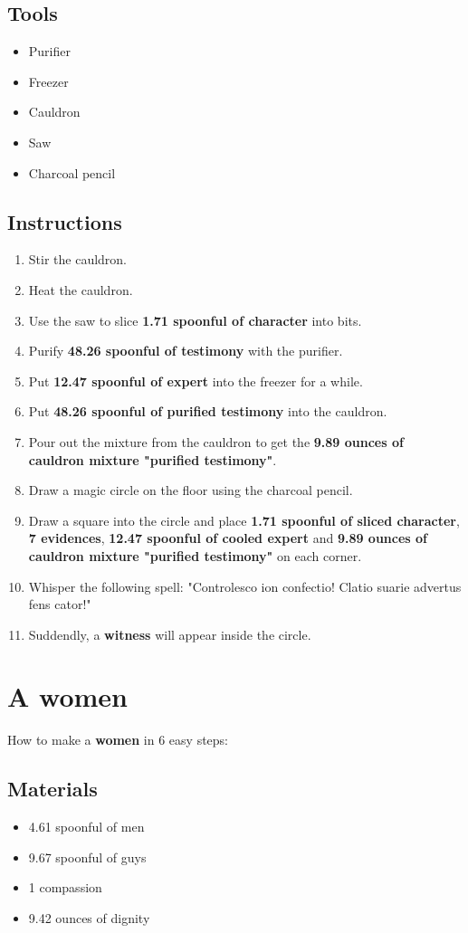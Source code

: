 \documentclass{article}
\begin{document}
\subsection{Tools}\begin{itemize}
\item 
Purifier
\item 
Freezer
\item 
Cauldron
\item 
Saw
\item 
Charcoal pencil
\end{itemize}
\subsection{Instructions}\begin{enumerate}
\item 
Stir the cauldron.
\item 
Heat the cauldron.
\item 
Use the saw to slice \textbf{1.71 spoonful of character} into bits.
\item 
Purify \textbf{48.26 spoonful of testimony} with the purifier.
\item 
Put \textbf{12.47 spoonful of expert} into the freezer for a while.
\item 
Put \textbf{48.26 spoonful of purified testimony} into the cauldron.
\item 
Pour out the mixture from the cauldron to get the \textbf{9.89 ounces of cauldron mixture "purified testimony"}.
\item 
Draw a magic circle on the floor using the charcoal pencil.
\item 
Draw a square into the circle and place \textbf{1.71 spoonful of sliced character}, \textbf{7 evidences}, \textbf{12.47 spoonful of cooled expert} and \textbf{9.89 ounces of cauldron mixture "purified testimony"} on each corner.
\item 
Whisper the following spell: "Controlesco ion confectio! Clatio suarie advertus fens cator!"
\item 
Suddendly, a \textbf{witness} will appear inside the circle.
\end{enumerate}
\newpage
\section{A women}How to make a \textbf{women} in 6 easy steps:

\subsection{Materials}\begin{itemize}
\item 
4.61 spoonful of men
\item 
9.67 spoonful of guys
\item 
1 compassion
\item 
9.42 ounces of dignity
\end{itemize}
\end{document}
